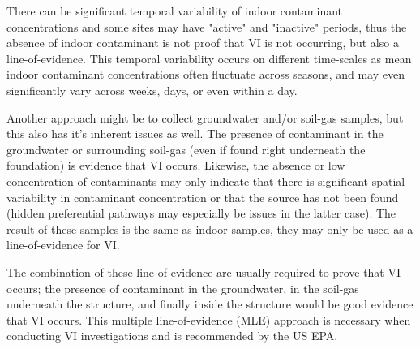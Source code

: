 \documentclass[../thesis.tex]{subfiles}
\begin{document}
There can be significant temporal variability of indoor contaminant concentrations and some sites may have "active" and "inactive" periods, thus the absence of indoor contaminant is not proof that VI is not occurring, but also a line-of-evidence.
This temporal variability occurs on different time-scales as mean indoor contaminant concentrations often fluctuate across seasons, and may even significantly vary across weeks, days, or even within a day. \par

Another approach might be to collect groundwater and/or soil-gas samples, but this also has it's inherent issues as well.
The presence of contaminant in the groundwater or surrounding soil-gas (even if found right underneath the foundation) is evidence that VI occurs.
Likewise, the absence or low concentration of contaminants may only indicate that there is significant spatial variability in contaminant concentration or that the source has not been found (hidden preferential pathways may especially be issues in the latter case).
The result of these samples is the same as indoor samples, they may only be used as a line-of-evidence for VI.\par

The combination of these line-of-evidence are usually required to prove that VI occurs; the presence of contaminant in the groundwater, in the soil-gas underneath the structure, and finally inside the structure would be good evidence that VI occurs.
This multiple line-of-evidence (MLE) approach is necessary when conducting VI investigations and is recommended by the US EPA.\par
\end{document}
